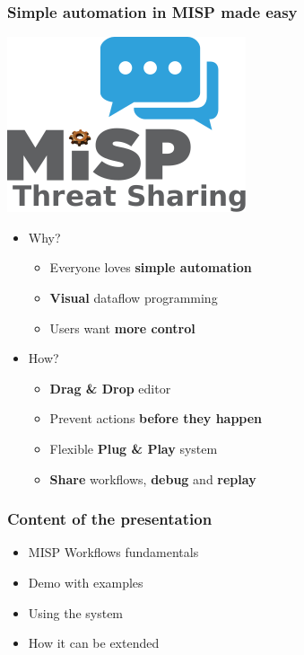 \begin{frame}
    \frametitle{Simple automation in MISP made easy}
    \begin{center}
        \includegraphics[width=0.3\linewidth]{pictures/automation.png}
    \end{center}
    \begin{itemize}
        \item Why?
        \begin{itemize}
            \item Everyone loves \textbf{simple automation}
            \item \textbf{Visual} dataflow programming
            \item Users want \textbf{more control}
        \end{itemize}
        \item How?
        \begin{itemize}
            \item \textbf{Drag \& Drop} editor
            \item Prevent actions \textbf{before they happen}
            \item Flexible \textbf{Plug \& Play} system
            \item \textbf{Share} workflows, \textbf{debug} and \textbf{replay}
        \end{itemize}
    \end{itemize}
\end{frame}

\begin{frame}
    \frametitle{Content of the presentation}
    \begin{itemize}
        \item MISP Workflows fundamentals
        \item Demo with examples
        \item Using the system
        \item How it can be extended
    \end{itemize}

    \vspace*{1em}
    \begin{center}
    \end{center}
\end{frame}

